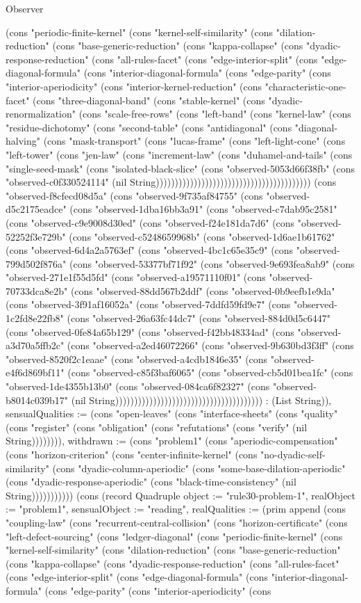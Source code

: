 \begin{lexlean}{Observer}
\begin{semanticmodule}
{(cons "periodic-finite-kernel" (cons "kernel-self-similarity" (cons "dilation-reduction" (cons "base-generic-reduction" (cons "kappa-collapse" (cons "dyadic-response-reduction" (cons "all-rules-facet" (cons "edge-interior-split" (cons "edge-diagonal-formula" (cons "interior-diagonal-formula" (cons "edge-parity" (cons "interior-aperiodicity" (cons "interior-kernel-reduction" (cons "characteristic-one-facet" (cons "three-diagonal-band" (cons "stable-kernel" (cons "dyadic-renormalization" (cons "scale-free-rows" (cons "left-band" (cons "kernel-law" (cons "residue-dichotomy" (cons "second-table" (cons "antidiagonal" (cons "diagonal-halving" (cons "mask-transport" (cons "lucas-frame" (cons "left-light-cone" (cons "left-tower" (cons "jen-law" (cons "increment-law" (cons "duhamel-and-tails" (cons "single-seed-mask" (cons "isolated-black-slice" (cons "observed-5053d66f38fb" (cons "observed-c0f330524114" (nil String))))))))))))))))))))))))))))))))))))))))) (cons "observed-f8cfecd08d5a" (cons "observed-9f735af84755" (cons "observed-d5c2175eadce" (cons "observed-1dba16bb3a91" (cons "observed-c7dab95c2581" (cons "observed-c9e9008d30ed" (cons "observed-f24e181da7d6" (cons "observed-52252f3e729b" (cons "observed-c5248659968b" (cons "observed-1d6ae1b61762" (cons "observed-6d4a2a5763ef" (cons "observed-4bc1c65e35c9" (cons "observed-799d502f876a" (cons "observed-53377bf71f92" (cons "observed-9e693fea8ab9" (cons "observed-271e1f55d5fd" (cons "observed-a19571110f01" (cons "observed-70733dca8e2b" (cons "observed-88dd567b2ddf" (cons "observed-0b9eefb1e9da" (cons "observed-3f91af16052a" (cons "observed-7ddfd59fd9e7" (cons "observed-1c2fd8e22fb8" (cons "observed-26a63fc44dc7" (cons "observed-884d0d5c6447" (cons "observed-0fe84a65b129" (cons "observed-f42bb48334ad" (cons "observed-a3d70a5ffb2c" (cons "observed-a2ed46072266" (cons "observed-9b630bd3f3ff" (cons "observed-8520f2c1eaae" (cons "observed-a4cdb1846e35" (cons "observed-e4f6d869bf11" (cons "observed-c85f3baf6065" (cons "observed-cb5d01bea1fc" (cons "observed-1de4355b13b0" (cons "observed-084ca6f82327" (cons "observed-b8014c039b17" (nil String))))))))))))))))))))))))))))))))))))))) : (List String)), sensualQualities := (cons "open-leaves" (cons "interface-sheets" (cons "quality" (cons "register" (cons "obligation" (cons "refutations" (cons "verify" (nil String)))))))), withdrawn := (cons "problem1" (cons "aperiodic-compensation" (cons "horizon-criterion" (cons "center-infinite-kernel" (cons "no-dyadic-self-similarity" (cons "dyadic-column-aperiodic" (cons "some-base-dilation-aperiodic" (cons "dyadic-response-aperiodic" (cons "black-time-consistency" (nil String))))))))))}) (cons (record Quadruple {object := "rule30-problem-1", realObject := "problem1", sensualObject := "reading", realQualities := (prim append (cons "coupling-law" (cons "recurrent-central-collision" (cons "horizon-certificate" (cons "left-defect-sourcing" (cons "ledger-diagonal" (cons "periodic-finite-kernel" (cons "kernel-self-similarity" (cons "dilation-reduction" (cons "base-generic-reduction" (cons "kappa-collapse" (cons "dyadic-response-reduction" (cons "all-rules-facet" (cons "edge-interior-split" (cons "edge-diagonal-formula" (cons "interior-diagonal-formula" (cons "edge-parity" (cons "interior-aperiodicity" (cons }
\end{semanticmodule}
\end{lexlean}

